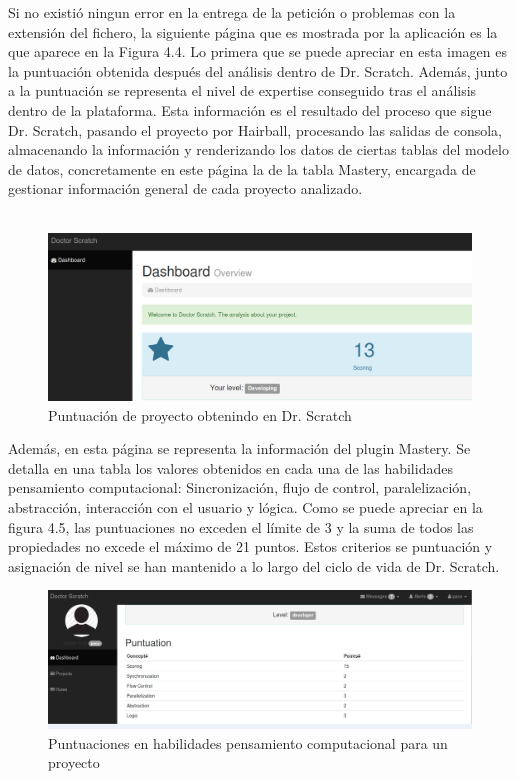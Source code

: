 \documentclass[a4paper, 12pt]{book}
\begin{document}
Si no existió ningun error en la entrega de la petición o problemas con la extensión del
fichero, la siguiente página que es mostrada por la aplicación es la que aparece en la
Figura 4.4. Lo primera que se puede apreciar en esta imagen es la puntuación obtenida 
después del análisis dentro de Dr. Scratch. Además, junto a la puntuación se representa
el nivel de expertise conseguido tras el análisis dentro de la plataforma. Esta 
información es el resultado del proceso que sigue Dr. Scratch, pasando el proyecto por
Hairball, procesando las salidas de consola, almacenando la información y renderizando los
datos de ciertas tablas del modelo de datos, concretamente en este página la de la tabla
Mastery, encargada de gestionar información general de cada proyecto analizado. \\ \\ 

 \begin{figure}
		\graphicspath{{img/}}
    \includegraphics[bb=0 0 800 600, width=14cm, keepaspectratio]{puntuacion.png}
		\caption{Puntuación de proyecto obtenindo en Dr. Scratch}
    \label{figura:foro_hilos}
 \end{figure} 

Además, en esta página se representa la información del plugin Mastery. Se detalla
en una tabla los valores obtenidos en cada una de las habilidades pensamiento
computacional: Sincronización, flujo de control, paralelización, abstracción,
interacción con el usuario y lógica. Como se puede apreciar en la figura 4.5, las
puntuaciones no exceden el límite de 3 y la suma de todos las propiedades no excede
el máximo de 21 puntos. Estos criterios se puntuación y asignación de nivel se han
mantenido a lo largo del ciclo de vida de Dr. Scratch. \\

\begin{figure}[h]
	\graphicspath{{img/}}
  \includegraphics[bb=0 0 800 600, width=14cm, keepaspectratio]{scoring.png}
	\caption{Puntuaciones en habilidades pensamiento computacional para un proyecto}
  \label{figura:foro_hilos}
\end{figure}
\end{document}
